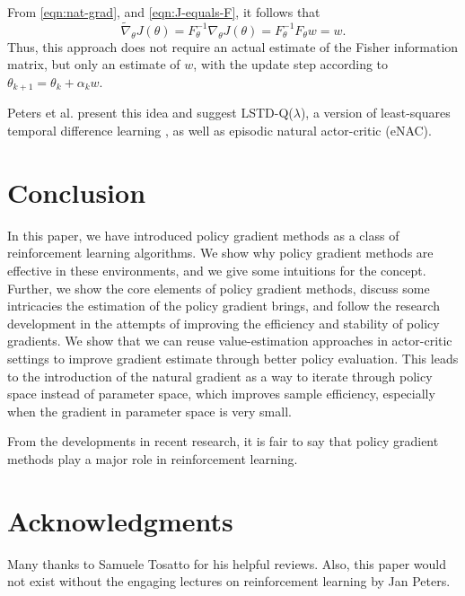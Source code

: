 \documentclass[conference, final]{IEEEtran}
\begin{document}
From \eqref{eqn:nat-grad}, and \eqref{eqn:J-equals-F}, it follows that
\begin{equation}
  \widetilde{\nabla}_\theta J(\theta) = F^{-1}_\theta \nabla_\theta J(\theta) = F_\theta^{-1} F_\theta w = w.
\end{equation}
Thus, this approach does not require an actual estimate of the Fisher information matrix, but only an estimate of $w$, with the update step according to $\theta_{k+1} = \theta_k + \alpha_k w$.

Peters et al. \cite{4863} present this idea and suggest LSTD-Q($\lambda$), a version of least-squares temporal difference learning  \cite{Boyan:1999:LTD:645528.657618}, as well as episodic natural actor-critic (eNAC).

\section{Conclusion}
\label{sec:outro}

In this paper, we have introduced policy gradient methods as a class of reinforcement learning algorithms. 
We show why policy gradient methods are effective in these environments, and we give some intuitions for the concept. 
Further, we show the core elements of policy gradient methods, discuss some intricacies the estimation of the policy gradient brings, and follow the research development in the attempts of improving the efficiency and stability of policy gradients.
We show that we can reuse value-estimation approaches in actor-critic settings to improve gradient estimate through better policy evaluation.
This leads to the introduction of the natural gradient as a way to iterate through policy space instead of parameter space, which improves sample efficiency, especially when the gradient in parameter space is very small.

From the developments in recent research, it is fair to say that policy gradient methods play a major role in reinforcement learning. 

\section*{Acknowledgments}

Many thanks to Samuele Tosatto for his helpful reviews. 
Also, this paper would not exist without the engaging lectures on reinforcement learning by Jan Peters.



\end{document}
